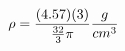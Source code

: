 \documentclass[preview]{standalone}
\begin{document}
\begin{align*}
\rho = {{(4.57)(3)} \over {32 \over 3} \pi} {g \over cm^3}
\end{align*}
\end{document}
